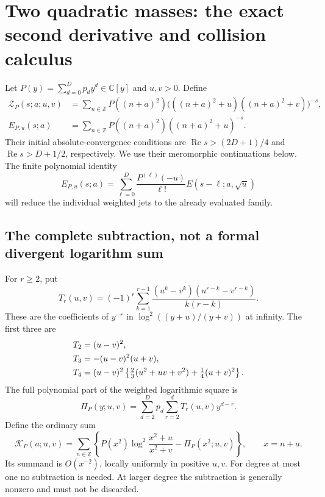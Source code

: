 \documentclass[11pt,letterpaper]{article}
\numberwithin{equation}{section}
\theoremstyle{definition}
\newcommand{\Rea}{\operatorname{Re}}
\newcommand{\C}{\mathbb C}
\newcommand{\Z}{\mathbb Z}
\begin{document}

\section{Two quadratic masses: the exact second derivative and collision calculus}
\label{hqj:sec:collision}

Let $P(y)=\sum_{d=0}^Dp_dy^d\in\C[y]$ and $u,v>0$. Define
\begin{align}
\mathcal Z_P(s;a;u,v)
&=\sum_{n\in\Z}P((n+a)^2)
\bigl(((n+a)^2+u)((n+a)^2+v)\bigr)^{-s},
\label{hqj:eq:product-spectrum}\\
E_{P,u}(s;a)
&=\sum_{n\in\Z}P((n+a)^2)((n+a)^2+u)^{-s}.
\label{hqj:eq:weighted-E}
\end{align}
Their initial absolute-convergence conditions are
$\Rea s>(2D+1)/4$ and $\Rea s>D+1/2$, respectively. We use their
meromorphic continuations below. The finite polynomial identity
\begin{equation}\label{hqj:eq:polynomial-translate}
E_{P,u}(s;a)=\sum_{\ell=0}^D
\frac{P^{(\ell)}(-u)}{\ell!}E(s-\ell;a,\sqrt u)
\end{equation}
will reduce the individual weighted jets to the already evaluated family.

\subsection{The complete subtraction, not a formal divergent logarithm sum}
For $r\ge2$, put
\begin{equation}\label{hqj:eq:Tr}
T_r(u,v)=(-1)^r\sum_{k=1}^{r-1}
\frac{(u^k-v^k)(u^{r-k}-v^{r-k})}{k(r-k)}.
\end{equation}
These are the coefficients of $y^{-r}$ in
$\log^2((y+u)/(y+v))$ at infinity. The first three are
\begin{align}
T_2&=(u-v)^2,\notag\\
T_3&=-(u-v)^2(u+v),\label{hqj:eq:Tlow}\\
T_4&=(u-v)^2\left\{\tfrac23(u^2+uv+v^2)+\tfrac14(u+v)^2\right\}.
\notag
\end{align}
The full polynomial part of the weighted logarithmic square is
\begin{equation}\label{hqj:eq:PiP}
\Pi_P(y;u,v)=\sum_{d=2}^Dp_d\sum_{r=2}^dT_r(u,v)y^{d-r}.
\end{equation}
Define the ordinary sum
\begin{equation}\label{hqj:eq:KP}
\mathcal K_P(a;u,v)=\sum_{n\in\Z}\left\{
P(x^2)\log^2\frac{x^2+u}{x^2+v}-\Pi_P(x^2;u,v)\right\},
\qquad x=n+a.
\end{equation}
Its summand is $O(x^{-2})$, locally uniformly in positive $u,v$.
For degree at most one no subtraction is needed. At larger degree the
subtraction is generally nonzero and must not be discarded.
\end{document}

